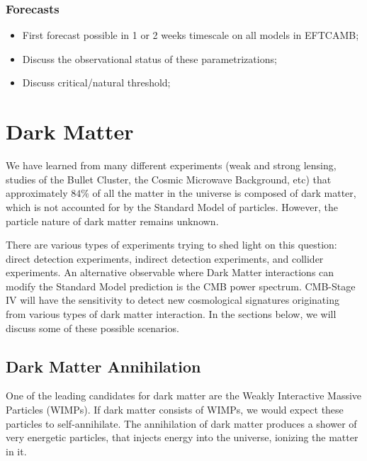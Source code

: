 \subsection{Forecasts}

\begin{itemize}
\item First forecast possible in 1 or 2 weeks timescale on all models in EFTCAMB;
\item Discuss the observational status of these parametrizations;
\item Discuss critical/natural threshold;
\end{itemize}
%



\chapter{Dark Matter}


We have learned from many different experiments (weak and strong lensing, studies of the Bullet Cluster, the Cosmic Microwave Background, etc) that approximately $84\%$ of all the matter in the universe is composed of dark matter, which is not accounted for by the Standard Model of particles. However, the particle nature of dark matter remains unknown.

There are various types of experiments trying to shed light on this question: direct detection experiments, indirect detection experiments, and collider experiments. 
An alternative observable where Dark Matter interactions can modify the Standard Model prediction is the CMB power spectrum.
CMB-Stage IV will have the sensitivity to detect new cosmological signatures originating from various types of dark matter interaction. In the sections below, we will discuss some of these possible scenarios.

\section{Dark Matter Annihilation}

One of the leading candidates for dark matter are the Weakly Interactive Massive Particles (WIMPs). If dark matter consists of WIMPs, we would expect these particles to self-annihilate. The annihilation of dark matter produces a shower of very energetic particles, that injects energy into the universe, ionizing the matter in it.

